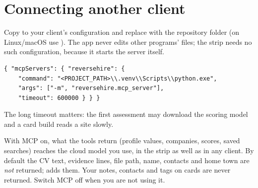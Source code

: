 \section{Connecting another client}
Copy  to your client's configuration and replace
 with the repository folder (on Linux/macOS use
). The app never edits other programs' files; the strip needs no
such configuration, because it starts the server itself.
\begin{lstlisting}
{ "mcpServers": { "reversehire": {
    "command": "<PROJECT_PATH>\\.venv\\Scripts\\python.exe",
    "args": ["-m", "reversehire.mcp_server"],
    "timeout": 600000 } } }
\end{lstlisting}
The long timeout matters: the first assessment may download the scoring model and a
card build reads a site slowly.

\begin{warnbox}
With MCP on, what the tools return (profile values, companies, scores, saved searches)
reaches the cloud model you use, in the strip as well as in any client. By default the
CV text, evidence lines, file path, name, contacts and home town are \emph{not} returned;
 adds them. Your notes, contacts and tags on cards are
never returned. Switch MCP off when you are not using it.
\end{warnbox}
